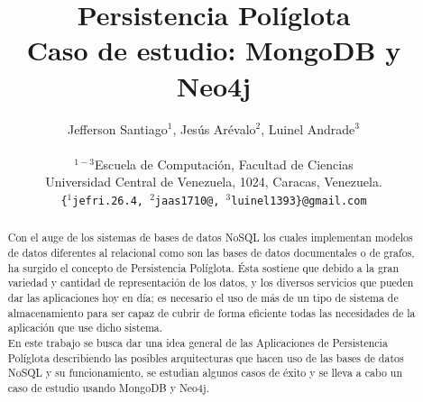 \documentclass[conference]{IEEEtran}
\begin{document}
\title{Persistencia Pol\'iglota\\Caso de estudio: MongoDB y Neo4j}

\author{
Jefferson Santiago$^{1}$, Jes\'us Ar\'evalo$^{2}$, Luinel Andrade$^{3}$\\ \\
\small{$^{1-3}$Escuela de Computaci\'on, Facultad de Ciencias}\\
\small{Universidad Central de Venezuela, 1024, Caracas, Venezuela.}\\
\small{\texttt{\{$^{1}$jefri.26.4, $^{2}$jaas1710@, $^{3}$luinel1393\}@gmail.com}} %
}
\author{
\and
{}
\and
{}
}


\maketitle


\begin{abstract}
Con el auge de los sistemas de bases de datos NoSQL los cuales implementan modelos de datos diferentes al relacional como son las bases de datos documentales o de grafos, ha surgido el concepto  de Persistencia Pol\'iglota. \'Esta sostiene que debido a la gran variedad y cantidad de representación de los datos, y los diversos servicios que pueden dar las aplicaciones hoy en d\'ia; es necesario el uso de m\'as de un tipo de sistema de almacenamiento para ser capaz de cubrir de forma eficiente todas las necesidades de la aplicaci\'on que use dicho sistema.\\
En este trabajo se busca dar una idea general de las Aplicaciones de Persistencia Pol\'iglota describiendo las posibles arquitecturas  que hacen uso de las bases de datos NoSQL y su funcionamiento, se estudian algunos casos de \'exito  y se lleva a cabo un caso de estudio usando MongoDB y Neo4j.

\end{abstract}
\end{document}
